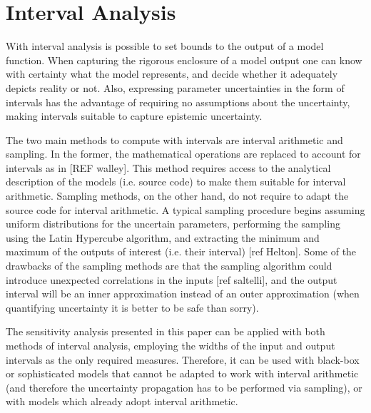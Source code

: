 \documentclass[twocolumn]{rps-esrel2022}
\begin{document}
\section{Interval Analysis}

With interval analysis is possible to set bounds to the output of a model function.
When capturing the rigorous enclosure of a model output one can know with certainty what the model represents, and decide
whether it adequately depicts reality or not.
Also, expressing parameter uncertainties in the form of intervals has the advantage of requiring no assumptions about the uncertainty, making intervals suitable to
capture epistemic uncertainty.

The two main methods to compute with intervals are interval arithmetic and sampling.
In the former, the mathematical operations are replaced to account for intervals as in [REF walley].
This method requires access to the analytical description of the models (i.e. source code) to make them suitable for
interval arithmetic.
Sampling methods, on the other hand, do not require to adapt the source code for interval arithmetic.
A typical sampling procedure begins assuming uniform distributions for the uncertain parameters, performing
the sampling using the Latin Hypercube algorithm, and extracting the minimum and maximum of the outputs of interest (i.e. their
interval) [ref Helton].
Some of the drawbacks of the sampling methods are that the sampling algorithm could introduce unexpected correlations in the inputs [ref saltelli],
and the output interval will be an inner approximation instead of an outer approximation (when quantifying uncertainty it is better to be safe than sorry).

The sensitivity analysis presented in this paper can be applied with both methods of interval analysis, employing the widths of the input and output intervals as
the only required measures.
Therefore, it can be used with black-box or sophisticated models that cannot be adapted to work with interval arithmetic (and therefore the uncertainty propagation
has to be performed via sampling), or with models which already adopt interval arithmetic.

\end{document}
